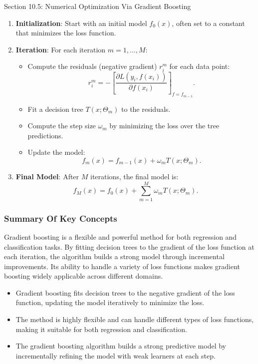 \begin{notes}{Section 10.5: Numerical Optimization Via Gradient Boosting}
    \begin{highlight}
        \begin{enumerate}
            \item \textbf{Initialization}: Start with an initial model $f_0(x)$, often set to a constant that minimizes the loss function.
            \item \textbf{Iteration}: For each iteration $m = 1, \dots, M$:
            \begin{itemize}
                \item Compute the residuals (negative gradient) $r_i^m$ for each data point:
                \[
                r_i^m = -\left[ \frac{\partial L(y_i, f(x_i))}{\partial f(x_i)} \right]_{f = f_{m-1}}.
                \]
                \item Fit a decision tree $T(x; \Theta_m)$ to the residuals.
                \item Compute the step size $\omega_m$ by minimizing the loss over the tree predictions.
                \item Update the model: 
                \[
                f_m(x) = f_{m-1}(x) + \omega_m T(x; \Theta_m).
                \]
            \end{itemize}
            \item \textbf{Final Model}: After $M$ iterations, the final model is:
            \[
            f_M(x) = f_0(x) + \sum_{m=1}^{M} \omega_m T(x; \Theta_m).
            \]
        \end{enumerate}
    \end{highlight}
    
    \subsubsection*{Summary Of Key Concepts}
    
    Gradient boosting is a flexible and powerful method for both regression and classification tasks. By fitting decision trees to the gradient of the loss function at each iteration, the algorithm 
    builds a strong model through incremental improvements. Its ability to handle a variety of loss functions makes gradient boosting widely applicable across different domains.
    
    \begin{highlight}
        \begin{itemize}
            \item Gradient boosting fits decision trees to the negative gradient of the loss function, updating the model iteratively to minimize the loss.
            \item The method is highly flexible and can handle different types of loss functions, making it suitable for both regression and classification.
            \item The gradient boosting algorithm builds a strong predictive model by incrementally refining the model with weak learners at each step.
        \end{itemize}
    \end{highlight}
\end{notes}

